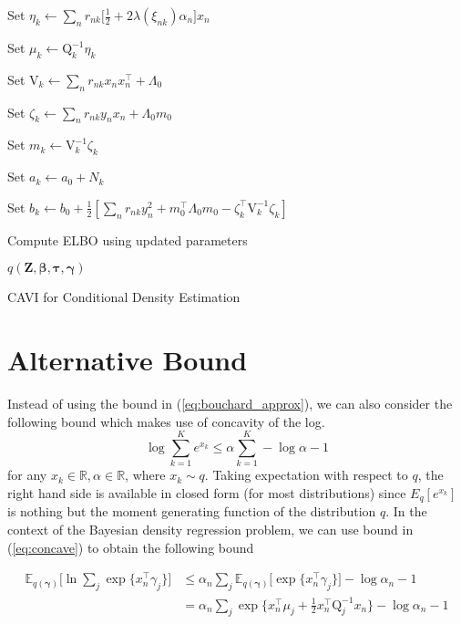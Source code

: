 \documentclass[twoside,11pt]{article}
\newcommand{\transpose}[1]{#1^{\intercal}}
\newcommand{\R}{\mathbb{R}}
\newcommand{\nsum}{\sum\limits_{n}}
\newcommand{\boldbeta}{\boldsymbol\beta}
\newcommand{\boldgamma}{\boldsymbol\gamma}
\newcommand{\boldtau}{\boldsymbol\tau}
\newcommand{\E}{\mathbb{E}}
\begin{document}
\begin{algorithm}[H]
{{   Set $\eta_k \leftarrow \sum_{n} r_{nk} \big[ \frac{1}{2} + 2\lambda(\xi_{nk}) \alpha_n \big]x_n$\; %
         
   Set $\mu_k \leftarrow \mathrm{Q}_k^{-1} \eta_k$\; %
   
   Set $\mathrm{V}_k \leftarrow \nsum r_{nk} x_n \transpose{x_n} + \Lambda_0$ \; %
   
   Set $\zeta_k \leftarrow \sum_{n} r_{nk} y_n x_n + \Lambda_0 m_0$\; %
   
   Set $m_k \leftarrow \mathrm{V}_k^{-1} \zeta_k$\; %
   
   Set $a_k \leftarrow a_0 + N_k$\; %
   
   Set $b_k \leftarrow b_0 + \frac{1}{2}[\nsum r_{nk} y_n^2 + \transpose{m_0}\Lambda_0 m_0 - \transpose{\zeta_k} \mathrm{V}_k^{-1} \zeta_k]$\; %
   }
   Compute ELBO using updated parameters
 } %
 \Return $q \left( \mathbf{Z}, \boldbeta, \boldtau, \boldgamma \right)$
 \caption{CAVI for Conditional Density Estimation}
\end{algorithm}



\section{Alternative Bound} \label{sec:alt}
Instead of using the bound in (\ref{eq:bouchard_approx}), we can also consider the following bound which makes use of concavity of the log.
\begin{equation} \label{eq:concave}
	\log \sum_{k=1}^{K} e^{x_k} \leq \alpha \sum_{k=1}^{K} - \log \alpha - 1
\end{equation}
for any $x_k \in \R, \alpha \in \R$, where $x_k \sim q$. Taking expectation with respect to $q$, the right hand side is available in closed form (for most distributions) since $E_{q}[e^{x_k}]$ is nothing but the moment generating function of the distribution $q$. In the context of the Bayesian density regression problem, we can use bound in (\ref{eq:concave}) to obtain the following bound

\begin{equation} \label{eq:alt_bound}
\begin{split}
	 \E_{q(\boldgamma)} \Big[ \ln \sum_{j} \exp \{ \transpose{x_n} \gamma_j \} \Big] & \leq \alpha_n 
	 \sum_{j} \E_{q(\boldgamma)} \Big[ \exp \{ \transpose{x_n} \gamma_j \} \Big] - \log \alpha_n - 1 \\
	 &= \alpha_n \sum_{j} \exp\Big\{ \transpose{x_n} \mu_j + \frac{1}{2} \transpose{x_n}\mathrm{Q}_j^{-1} x_n \Big\} - \log \alpha_n - 1
\end{split}
\end{equation}
\end{document}
